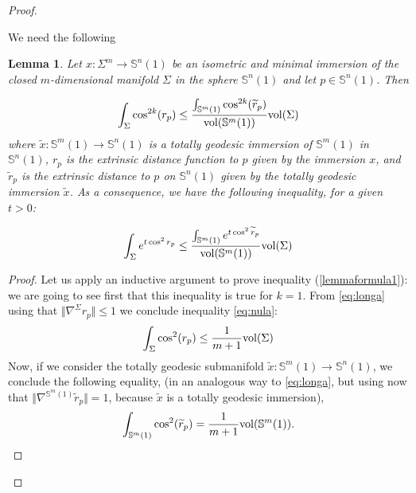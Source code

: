\documentclass[11pt,letterpaper]{amsart}
\newtheorem{lemma}[theorem]{Lemma}
\theoremstyle{definition}
\theoremstyle{remark}
\newcommand{\ese}{\mathbb{S}}
\begin{document}
\begin{proof}\

We need the following 


\begin{lemma}\label{keylemaimm}
Let  $x: \Sigma^m \to \mathbb{S}^n(1)$ be an isometric and minimal immersion of the closed $m$-dimensional manifold $\Sigma$ in the sphere  $\mathbb{S}^n(1)$ and let $p\in \mathbb{S}^n(1)$. Then

\begin{equation}\label{lemmaformula1}
\int_\Sigma \cos^{2k}(r_p) \leq \frac{\int_{\mathbb{S}^m(1)} \cos^{2k}(\widetilde{r}_p)}{{\rm vol}(\mathbb{S}^m(1))} {\rm vol}(\Sigma)
\end{equation}
where $\widetilde{x}: \mathbb{S}^m(1) \rightarrow \mathbb{S}^n(1)$ is a totally geodesic immersion of $\ese^m(1)$ in $\ese^n(1)$, $r_p$ is the extrinsic distance function to $p$ given by the immersion $x$, and $\widetilde{r}_p$ is the extrinsic distance to $p$ on $\ese^n(1)$ given by the totally geodesic immersion $\widetilde{x}$. As a consequence, we have the following inequality,  for a given $t>0$:

\begin{equation}\label{lemmaformula2}
\int_{\Sigma} e^{t \cos^2r_p}  \leq\frac{\int_{\ese^m(1)} e^{t \cos^2\widetilde{r}_p}}{{\rm vol}(\mathbb{S}^m(1))} {\rm vol}(\Sigma)
\end{equation}
\end{lemma}
\begin{proof}

Let us apply an inductive argument to prove inequality (\ref{lemmaformula1}): we are going to see first that this inequality is true for $k=1$.  From \eqref{eq:longa} using that $\Vert \nabla^\Sigma r_p\Vert\leq 1$ we conclude inequality \eqref{eq:nula}:
$$
\int_\Sigma \cos^2(r_p) \leq \frac{1}{m+1} {\rm vol}(\Sigma)
$$
Now, if we consider the totally geodesic submanifold $\widetilde{x}: \mathbb{S}^m(1) \rightarrow \mathbb{S}^n(1)$, we conclude the following equality, (in an analogous way  to \eqref{eq:longa}, but using now that $\Vert\nabla^{\mathbb{S}^m(1)} \widetilde{r}_p\Vert=1$, because $\widetilde{x}$ is a totally geodesic immersion), 
\begin{equation}\label{eqcinc}
\int_{\mathbb{S}^m(1)} \cos^2(\widetilde{r}_p) = \frac{1}{m+1} {\rm vol}(\mathbb{S}^m(1)).
\end{equation}


\end{proof}
\end{proof}
\end{document}
